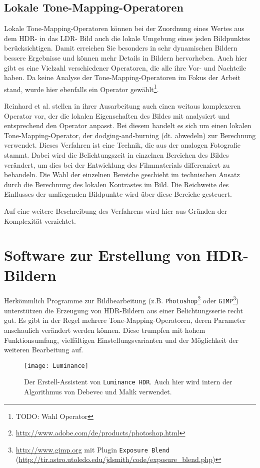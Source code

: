 \subsection{Lokale \gls{Tone-Mapping}-Operatoren}
\label{sub:tone:local}

Lokale \gls{Tone-Mapping}-Operatoren können bei der Zuordnung eines Wertes aus dem \gls{HDR}- in das \gls{LDR}- Bild auch die lokale Umgebung eines jeden Bildpunktes berücksichtigen. Damit erreichen Sie besonders in sehr dynamischen Bildern bessere Ergebnisse und können mehr Details in Bildern hervorheben. Auch hier gibt es eine Vielzahl verschiedener Operatoren, die alle ihre Vor- und Nachteile haben. Da keine Analyse der \gls{Tone-Mapping}-Operatoren im Fokus der Arbeit stand, wurde hier ebenfalls ein Operator gewählt\footnote{TODO: Wahl Operator}.
 
Reinhard et al. \cite{ReinhardToneMapper} stellen in ihrer Ausarbeitung auch einen weitaus komplexeren Operator vor, der die lokalen Eigenschaften des Bildes mit analysiert und entsprechend den Operator anpasst. Bei diesem handelt es sich um einen lokalen \gls{Tone-Mapping}-Operator, der dodging-and-burning (dt. abwedeln) zur Berechnung verwendet. Dieses Verfahren ist eine Technik, die aus der analogen Fotografie stammt. Dabei wird die Belichtungszeit in einzelnen Bereichen des Bildes verändert, um dies bei der Entwicklung des Filmmaterials differenziert zu behandeln. Die Wahl der einzelnen Bereiche geschieht im technischen Ansatz durch die Berechnung des lokalen Kontrastes im Bild. Die Reichweite des Einflusses der umliegenden Bildpunkte wird über diese Bereiche gesteuert.

Auf eine weitere Beschreibung des Verfahrens wird hier aus Gründen der Komplexität verzichtet.


\section{Software zur Erstellung von HDR-Bildern}
\label{sec:software}
Herkömmlich Programme zur Bildbearbeitung (z.B. \texttt{Photoshop}\footnote{\url{http://www.adobe.com/de/products/photoshop.html}} oder \texttt{GIMP}\footnote{\url{http://www.gimp.org} mit Plugin \texttt{Exposure Blend} (\url{http://tir.astro.utoledo.edu/jdsmith/code/exposure_blend.php})}) unterstützen die Erzeugung von \gls{HDR}-Bildern aus einer Belichtungsserie recht gut. Es gibt in der Regel mehrere \gls{Tone-Mapping}-Operatoren, deren Parameter anschaulich verändert werden können. Diese trumpfen mit hohem Funktionsumfang, vielfältigen Einstellungsvarianten und der Möglichkeit der weiteren Bearbeitung auf.
\begin{figure}[h]
  \begin{center}
    \texttt{[image: Luminance]}
    \caption{Der Erstell-Assistent von \texttt{Luminance HDR}. Auch hier wird intern der Algorithmus von Debevec und Malik \cite{paper} verwendet.}
    \label{fig:luminance}
  \end{center}
\end{figure}

